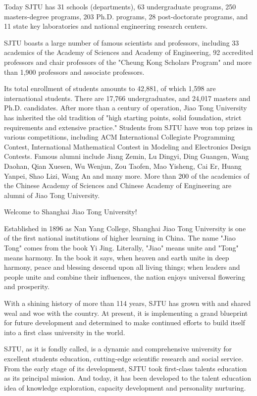 \begin{bigabstract}
Today SJTU has 31 schools (departments), 63 undergraduate programs, 250 masters-degree programs, 203 Ph.D. programs, 28 post-doctorate programs, and 11 state key laboratories and national engineering research centers.

SJTU boasts a large number of famous scientists and professors, including 33 academics of the Academy of Sciences and Academy of Engineering, 92 accredited professors and chair professors of the "Cheung Kong Scholars Program" and more than 1,900 professors and associate professors.

Its total enrollment of students amounts to 42,881, of which 1,598 are international students. There are 17,766 undergraduates, and 24,017 masters and Ph.D. candidates. After more than a century of operation, Jiao Tong University has inherited the old tradition of "high starting points, solid foundation, strict requirements and extensive practice." Students from SJTU have won top prizes in various competitions, including ACM International Collegiate Programming Contest, International Mathematical Contest in Modeling and Electronics Design Contests. Famous alumni include Jiang Zemin, Lu Dingyi, Ding Guangen, Wang Daohan, Qian Xuesen, Wu Wenjun, Zou Taofen, Mao Yisheng, Cai Er, Huang Yanpei, Shao Lizi, Wang An and many more. More than 200 of the academics of the Chinese Academy of Sciences and Chinese Academy of Engineering are alumni of Jiao Tong University.

Welcome to Shanghai Jiao Tong University!

Established in 1896 as Nan Yang College, Shanghai Jiao Tong University is one of the first national institutions of higher learning in China. The name "Jiao Tong" comes from the book Yi Jing. Literally, "Jiao" means unite and "Tong" means harmony. In the book it says, when heaven and earth unite in deep harmony, peace and blessing descend upon all living things; when leaders and people unite and combine their influences, the nation enjoys universal flowering and prosperity.

With a shining history of more than 114 years, SJTU has grown with and shared weal and woe with the country. At present, it is implementing a grand blueprint for future development and determined to make continued efforts to build itself into a first class university in the world.

SJTU, as it is fondly called, is a dynamic and comprehensive university for excellent students education, cutting-edge scientific research and social service. From the early stage of its development, SJTU took first-class talents education as its principal mission. And today, it has been developed to the talent education idea of knowledge exploration, capacity development and personality nurturing.


\end{bigabstract}
